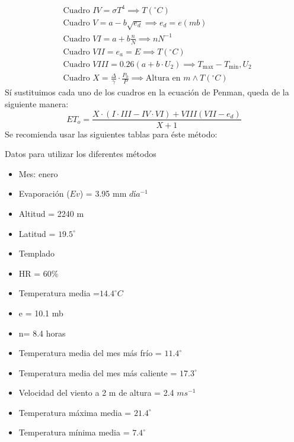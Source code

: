         \begin{align}
            &\text{Cuadro } IV =\sigma T^4\implies T(^{\circ}C)\\
            &\text{Cuadro } V = a - b\sqrt{e_d}\implies e_d = e(mb)\\
            &\text{Cuadro } VI = a + b\frac{n}{N}\implies nN^{-1}\\
            &\text{Cuadro } VII = e_a = E\implies T(^{\circ}C)\\
            &\text{Cuadro } VIII = 0.26\left(a + b \cdot U_2\right)\implies T_{\max} - T_{\min},U_2\\
            &\text{Cuadro } X =\frac{\Delta}{\gamma}\cdot \frac{P_0}{P}\implies \text{Altura en }m\land T(^{\circ}C)
        \end{align}
        Sí sustituimos cada uno de los cuadros en la ecuación de Penman, queda de la siguiente manera:
        \begin{equation}
            ET_o =\frac{X \cdot \left(I \cdot III - IV \cdot VI \right) + VIII\left(VII - e_d\right)}{X + 1}
        \end{equation}
Se recomienda usar las siguientes tablas para éste método:

Datos para utilizar los diferentes métodos
\begin{itemize}
    \item Mes: enero
    \item Evaporación ($Ev$) = 3.95 mm $día^{-1}$
    \item Altitud = 2240 m
    \item Latitud = $19.5^{\circ}$
    \item Templado
    \item HR = 60\%
    \item Temperatura media =$ 14.4^{\circ}C$
    \item e = 10.1 mb
    \item n= 8.4 horas
    \item Temperatura media del mes más frío = $11.4^{\circ}$
    \item Temperatura media del mes más caliente = $17.3^{\circ}$
    \item Velocidad del viento a 2 m de altura = 2.4 $ms^{-1}$
    \item Temperatura máxima media = $21.4^{\circ}$
    \item Temperatura mínima media = $7.4^{\circ}$
\end{itemize}

